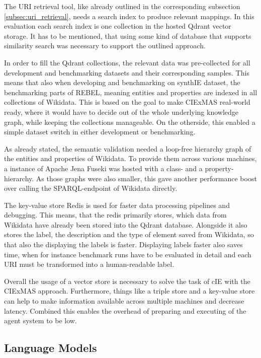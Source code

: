 \documentclass[a4paper,oneside,bibliography=totoc]{scrbook}
\begin{document}
The URI retrieval tool, like already outlined in the corresponding subsection \ref{subsec:uri_retrieval}, needs a search index to produce relevant mappings. In this evaluation each search index is one collection in the hosted Qdrant vector storage. It has to be mentioned, that using some kind of database that supports similarity search was necessary to support the outlined approach.

In order to fill the Qdrant collections, the relevant data was pre-collected for all development and benchmarking datasets and their corresponding samples. This means that also when developing and benchmarking on synthIE dataset, the benchmarking parts of REBEL, meaning entities and properties are indexed in all collections of Wikidata. This is based on the goal to make CIExMAS real-world ready, where it would have to decide out of the whole underlying knowledge graph, while keeping the collections manageable. On the otherside, this enabled a simple dataset switch in either development or benchmarking.

As already stated, the semantic validation needed a loop-free hierarchy graph of the entities and properties of Wikidata. To provide them across various machines, a instance of Apache Jena Fuseki was hosted with a class- and a property-hierarchy. As those graphs were also smaller, this gave another performance boost over calling the SPARQL-endpoint of Wikidata directly.

The key-value store Redis is used for faster data processing pipelines and debugging. This means, that the redis primarily stores, which data from Wikidata have already been stored into the Qdrant database. Alongside it also stores the label, the description and the type of element saved from Wikidata, so that also the displaying the labels is faster. Displaying labels faster also saves time, when for instance benchmark runs have to be evaluated in detail and each URI must be transformed into a human-readable label.

Overall the usage of a vector store is necessary to solve the task of \ac{cIE} with the CIExMAS approach. Furthermore, things like a triple store and a key-value store can help to make information available across multiple machines and decrease latency. Combined this enables the overhead of preparing and executing of the agent system to be low.

\subsection{Language Models}
\label{subsec:eval_language_models}
\end{document}
